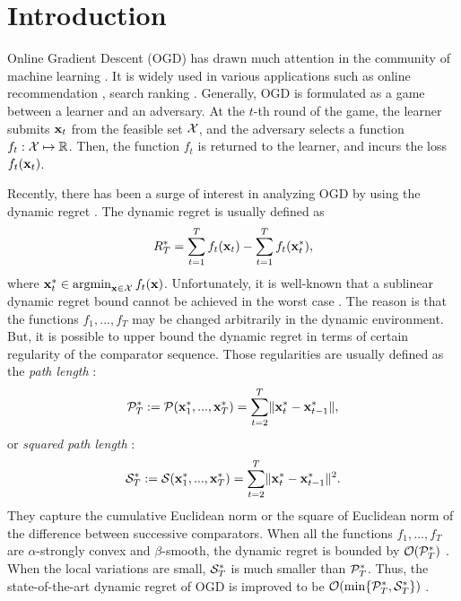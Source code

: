 \documentclass[journal]{IEEEtran}
\begin{document}
%
\IEEEpeerreviewmaketitle




\section{Introduction}
Online Gradient Descent (OGD) has drawn much attention in the  community of machine learning \cite{Zhu:2015tr,Hazan2007Adaptive,Hall:2015ct,ShalevShwartz:2012dz,Garber:2018wf,Bedi:2018te}. It is widely used in various applications such as online recommendation \cite{Song:2008:RAT}, search ranking \cite{Moon:2010}. Generally, OGD is formulated as a game between a learner and an adversary. At the $t$-th round of the game, the learner submits ${\bf x}_t$ from the feasible set ${\mathcal{X}}$, and the adversary selects a function $f_t:{\mathcal{X}} \mapsto \mathbb{R}$. Then, the function $f_t$ is returned to the learner, and incurs the loss $f_t({\bf x}_t)$. 

Recently, there has been a surge of interest in analyzing OGD by using the dynamic regret \cite{Zinkevich:2003,Mokhtari:2016jz,Yang:2016ud,Lei:2017:CUO}. The dynamic regret is usually defined as 
\begin{align}
\label{eq:regret_dy}
R_T^{\ast} = \sum\limits_{t=1}^T f_t(\x_t) - \sum\limits_{t=1}^T f_t(\x_t^{\ast}), 
\end{align} where $\x_t^{\ast} \in \argmin_{\x\in\Xcal} f_t(\x)$. Unfortunately, it is well-known that a sublinear dynamic regret bound cannot be achieved in the worst case \cite{Zinkevich:2003}. The reason is that the functions $f_1, ..., f_T$ may be changed arbitrarily in the dynamic environment. But, it is possible to upper bound the dynamic regret in terms of certain regularity of the comparator sequence. Those regularities are usually defined as the \textit{path length} \cite{Mokhtari:2016jz,Yang:2016ud}: 
\begin{align}
\nonumber
{\mathcal{P}}_T^{\ast} := {\mathcal{P}}({\bf x}_1^{\ast}, ..., {\bf x}_T^{\ast}) = \sum\limits_{t=2}^T \lVert{\bf x}_t^{\ast} - {\bf x}_{t-1}^{\ast}\rVert,
\end{align}  or \textit{squared path length} \cite{Zhang:2016wl}: 
\begin{align}
\nonumber
{\mathcal{S}}_T^{\ast} := {\mathcal{S}}({\bf x}_1^{\ast}, ..., {\bf x}_T^{\ast}) = \sum\limits_{t=2}^T \lVert{\bf x}_t^{\ast} - {\bf x}_{t-1}^{\ast}\rVert^2.
\end{align} They capture the cumulative Euclidean norm or the square of Euclidean norm of the difference between successive comparators. When all the functions $f_1, ..., f_T$ are $\alpha$-strongly convex and $\beta$-smooth, the dynamic regret is bounded by ${\mathcal{O}}({\mathcal{P}}_T^{\ast})$ \cite{Mokhtari:2016jz}.  When the local variations are small, ${\mathcal{S}}_T^{\ast}$ is much smaller than ${\mathcal{P}}_T^{\ast}$. Thus, the state-of-the-art dynamic regret of OGD is improved to be ${\mathcal{O}}(\min\{{\mathcal{P}}_T^{\ast}, {\mathcal{S}}_T^{\ast}\})$ \cite{Zhang:2016wl}. 
\end{document}
